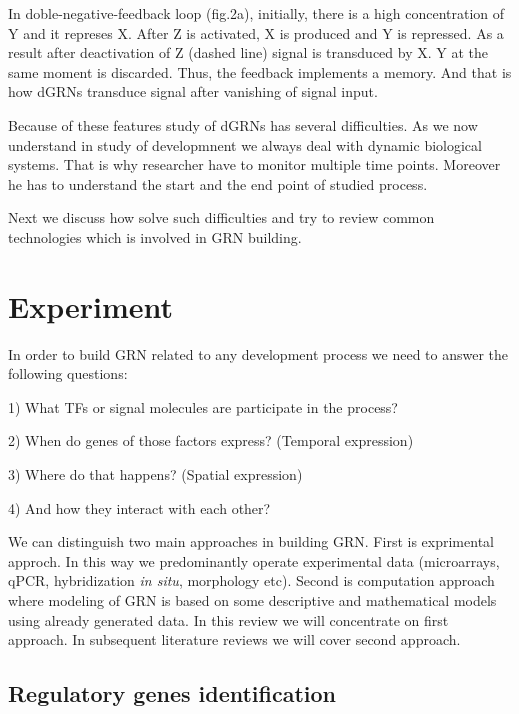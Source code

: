 \documentclass[a4paper, oneside]{report}
\begin{document}
In doble-negative-feedback loop (fig.2a), initially, there is a high concentration of Y and it represes X.
After Z is activated, X is produced and Y is repressed.
As a result after deactivation of Z (dashed line) signal is transduced by X.
Y at the same moment is discarded.
Thus, the feedback implements a memory.
And that is how dGRNs transduce signal after vanishing of signal input.

Because of these features study of dGRNs has several difficulties.
As we now understand in study of developmnent we always deal with dynamic biological systems.
That is why researcher have to monitor multiple time points.
Moreover he has to understand the start and the end point of studied process.

Next we discuss how solve such difficulties and try to review common technologies which is involved in GRN building.   

\section*{Experiment}

In order to build GRN related to any development process we need to answer the following questions:

\vspace{2mm}

1) What TFs or signal molecules are participate in the process? 

2) When do genes of those factors express? (Temporal expression)

3) Where do that happens? (Spatial expression)

4) And how they interact with each other?

\vspace{2mm}

We can distinguish two main approaches in building GRN. First is exprimental approch. In this way we predominantly operate experimental data (microarrays, qPCR, hybridization \textit{in situ}, morphology etc). Second is computation approach where modeling of GRN is based on some descriptive and mathematical models using already generated data. In this review we will concentrate on first approach. In subsequent literature reviews we will cover second approach.

\subsection*{Regulatory genes identification}
\end{document}
